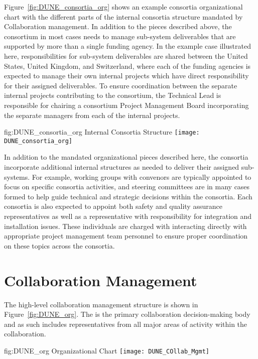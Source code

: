Figure~\ref{fig:DUNE_consortia_org} shows an example consortia organizational 
chart with the different parts of the internal consortia structure mandated 
by  Collaboration management.  In addition to the pieces described 
above, the consortium in most cases needs to manage sub-system deliverables 
that are supported by more than a single funding agency.  In the example case 
illustrated here, responsibilities for sub-system deliverables are shared 
between the United States, United Kingdom, and Switzerland, where each of the 
funding agencies is expected to manage their own internal projects which have
direct responsibility for their assigned deliverables.  To ensure coordination
between the separate internal projects contributing to the consortium, the 
Technical Lead is responsible for chairing a consortium Project Management 
Board incorporating the separate managers from each of the internal projects.   
\begin{dunefigure}{fig:DUNE_consortia_org}
  { Internal Consortia Structure}
  \texttt{[image: DUNE\_consortia\_org]}
\end{dunefigure}

In addition to the mandated organizational pieces described here, the consortia 
incorporate additional internal structures as needed to deliver their assigned 
sub-systems.  For example, working groups with convenors are typically appointed 
to focus on specific consortia activities, and steering committees are in many 
cases formed to help guide technical and strategic decisions within the consortia.
Each consortia is also expected to appoint both safety and quality assurance  
representatives as well as a representative with responsibility for integration 
and installation issues.  These individuals are charged with interacting directly 
with appropriate project management team personnel to ensure proper coordination 
on these topics across the consortia.        

\section{ Collaboration Management}
\label{sec:dune_mgmt}

The high-level  collaboration management structure is shown 
in Figure~\ref{fig:DUNE_org}.  The   is the primary
collaboration decision-making body and as such includes representatives 
from all major areas of activity within the collaboration.
\begin{dunefigure}{fig:DUNE_org}
  { Organizational Chart}
  \texttt{[image: DUNE\_COllab\_Mgmt]}
\end{dunefigure}

